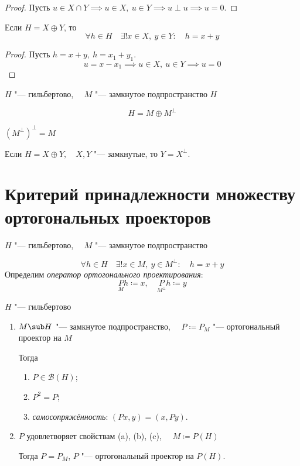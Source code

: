 \begin{proof}
	Пусть $ u \in X \cap Y \implies u \in X, ~ u \in Y \implies
	u \perp u \implies u = 0 $.
\end{proof}

\begin{remark}
	Если $ H = X \oplus Y $, то
	$$ \forall h \in H \quad \exists!x \in X, ~ y \in Y : \quad h = x + y $$
\end{remark}

\begin{proof}
	Пусть $ h = x + y, ~ h = x_1 + y_1 $.
	$$ u = x - x_1 \implies
	u \in X, ~ u \in Y \implies u = 0 $$
\end{proof}

\begin{implication}
	$ H $ "--- гильбертово, $ \quad M $ "--- замкнутое подпространство $ H $

	$$ H = M \oplus M^\perp $$
\end{implication}

\begin{implication}
	$ (M^\perp)^\perp = M $
\end{implication}

\begin{implication}
	Если $ H = X \oplus Y, \quad X, Y $ "--- замкнутые, то $ Y = X^\perp $.
\end{implication}

\section{Критерий принадлежности множеству ортогональных проекторов}

\begin{definition}
	$ H $ "--- гильбертово, $ \quad M $ "--- замкнутое подпространство

	$$ \forall h \in H \quad \exists !x \in M, ~ y \in M^\perp : \quad h = x + y $$
	Определим \emph{оператор ортогонального проектирования}:
	$$ \underset M P h \coloneq x, \quad \underset{M^\perp}P h \coloneq y $$
\end{definition}

\begin{theorem}
	$ H $ "--- гильбертово
	\begin{enumerate}
		\item $ M \sub H $ "--- замкнутое подпространство, $ \quad
			P \coloneq P_M $ "--- ортогональный проектор на $ M $

			Тогда
			\begin{enumerate}
				\item $ P \in \mathscr B(H) $;
				\item $ P^2 = P $;
				\item \emph{самосопряжённость}: $ (Px, y) = (x, Py) $.
			\end{enumerate}
		\item $ P $ удовлетворяет свойствам (a), (b), (c), $ \quad
			M \coloneq P(H) $

			Тогда $ P = P_M $, \ie $ P $ "--- ортогональный проектор на $ P(H) $.
	\end{enumerate}
\end{theorem}

